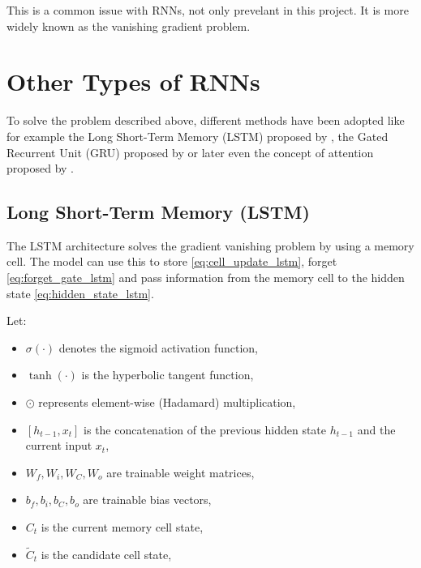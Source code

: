 \documentclass{article}
\begin{document}
This is a common issue with RNNs, not only prevelant in this project. It is 
more widely known as the vanishing gradient problem.

\section{Other Types of RNNs}
To solve the problem described above, different methods have been adopted 
like for example the Long Short-Term Memory (LSTM) proposed by \cite{6795963}, 
the Gated Recurrent Unit (GRU) proposed by \cite{cho2014propertiesneuralmachinetranslation} 
or later even the concept of attention proposed by \cite{bahdanau2016neuralmachinetranslationjointly}.

\subsection{ Long Short-Term Memory (LSTM)}
The LSTM architecture solves the gradient vanishing problem by using a memory 
cell. The model can use this to store \eqref{eq:cell_update_lstm}, forget 
\eqref{eq:forget_gate_lstm} and pass information from the 
memory cell to the hidden state \eqref{eq:hidden_state_lstm}.

Let: 
\begin{itemize}
    \item $\sigma(\cdot)$ denotes the sigmoid activation function,
    \item $\tanh(\cdot)$ is the hyperbolic tangent function,
    \item $\odot$ represents element-wise (Hadamard) multiplication,
    \item $[h_{t-1}, x_t]$ is the concatenation of the previous hidden state $h_{t-1}$ and the current input $x_t$,
    \item $W_f, W_i, W_C, W_o$ are trainable weight matrices,
    \item $b_f, b_i, b_C, b_o$ are trainable bias vectors,
    \item $C_t$ is the current memory cell state,
    \item $\tilde{C}_t$ is the candidate cell state,
\end{itemize}
\end{document}
